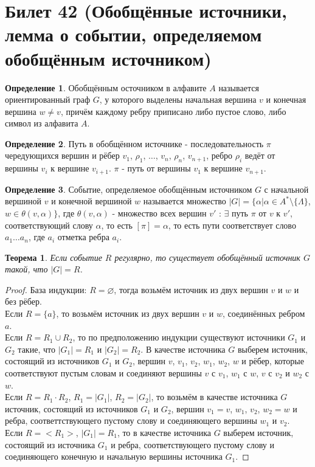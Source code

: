 \documentclass[a4paper, 12pt]{article}
\theoremstyle{definition}
\newtheorem*{definition}{Определение}
\theoremstyle{plain}
\newtheorem*{theorem}{Теорема}
\theoremstyle{remark}
\begin{document}
  \section{Билет 42 (Обобщённые источники, лемма о событии, определяемом обобщённым источником)}
  \begin{definition}
    Обобщённым осточником в алфавите $A$ называется ориентированный граф $G$, у которого выделены начальная вершина $v$ и конечная вершина $w\neq v$, причём каждому ребру приписано либо пустое слово, либо символ из алфавита $A$.
  \end{definition}
  \begin{definition}
    Путь в обобщённом источнике - последовательность $\pi$ чередующихся вершин и рёбер $v_1$, $\rho_1$, $\ldots$, $v_n$, $\rho_n$, $v_{n+1}$, ребро $\rho_i$ ведёт от вершины $v_i$ к вершине $v_{i+1}$. $\pi$ - путь от вершины $v_1$ к вершине $v_{n+1}$.
  \end{definition}
  \begin{definition}
    Событие, определяемое обобщённым источником $G$ с начальной вершиной $v$ и конечной вершиной $w$ называется множество $|G|=\{\alpha|\alpha\in A^*\setminus\{\Lambda\}$, $w\in \theta(v,\alpha)\}$, где $\theta(v,\alpha)$ - множество всех вершин $v'$ : $\exists$ путь $\pi$ от $v$ к $v'$, соответствующий слову $\alpha$, то есть $[\pi]=\alpha$, то есть пути соответствует слово $a_1\ldots a_n$, где $a_i$ отметка ребра $a_i$.
  \end{definition}
  \begin{theorem}
    Если событие $R$ регулярно, то существует обобщённый источник $G$ такой, что $|G|=R$.
  \end{theorem}
  \begin{proof}
    База индукции: $R=\varnothing$, тогда возьмём источник из двух вершин $v$ и $w$ и без рёбер.\\
    Если $R=\{a\}$, то возьмём источник из двух вершин $v$ и $w$, соединённых ребром $a$.\\
    Если $R=R_1\cup R_2$, то по предположению индукции существуют источники $G_1$ и $G_2$ такие, что $|G_1|=R_1$ и $|G_2|=R_2$. В качестве источника $G$ выберем источник, состоящий из источников $G_1$ и $G_2$, вершин $v$, $v_1$, $v_2$, $w_1$, $w_2$, $w$ и рёбер, которые соответствуют пустым словам и соединяют вершины $v$ с $v_1$, $w_1$ с $w$, $v$ с $v_2$ и $w_2$ с $w$.\\
    Если $R=R_1\cdot R_2$, $R_1=|G_1|$, $R_2=|G_2|$, то возьмём в качестве источника $G$ источник, состоящий из источников $G_1$ и $G_2$, вершин $v_1=v$, $w_1$, $v_2$, $w_2=w$ и ребра, соответтствующего пустому слову и соединяющего вершины $w_1$ и $v_2$.\\
    Если $R=<R_1>$, $|G_1|=R_1$, то в качестве источника $G$ выберем источник, состоящий из источника $G_1$ и  ребра, соответствующего пустому слову и соединяющего конечную и начальную вершины источника $G_1$.
  \end{proof}
\end{document}
